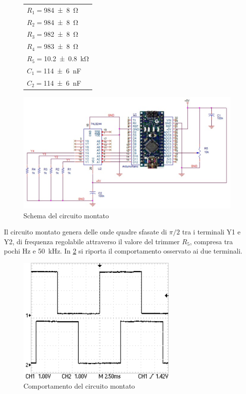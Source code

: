 \documentclass[a4paper,11pt]{article}
\begin{document}
\begin{figure}[H]
	\begin{minipage}{0.3\textwidth}
		\centering
		\begin{tabular}{l}
			$R_{1}=$\SI{984 \pm 8}{\ohm} \\$R_{2}=$\SI{984 \pm 8}{\ohm} \\$R_{3}=$\SI{982 \pm 8}{\ohm} \\
			$R_{4}=$\SI{983 \pm 8}{\ohm} \\$R_{5}=$\SI{10.2 \pm 0.8}{\kilo \ohm} \\
		$C_{1}=$\SI{114 \pm 6}{\nano\farad} \\$C_{2}=$\SI{114  \pm 6}{\nano\farad}
		\end{tabular}
	\end{minipage}
	\begin{minipage}{0.7\textwidth}
	\centering
	\includegraphics[scale=0.27]{imp.png}
	\caption{Schema del circuito montato}
	\label{f:impulsatore}
	\end{minipage}
\end{figure}

Il circuito montato genera delle onde quadre sfasate di $\pi/2$ tra i terminali Y1 e Y2, di frequenza regolabile attraverso il valore del trimmer $R_{5}$, compresa tra pochi \si{\hertz} e \SI{50}{\kilo\hertz}.
In \figurename{ \ref{f:oscil}} si riporta il comportamento osservato ai due terminali.

\begin{figure}[htb]
	\centering
	\includegraphics[scale=0.80]{ondaquadra_esempio.png}
	\caption{Comportamento del circuito montato}
	\label{f:oscil}
\end{figure}
\end{document}
